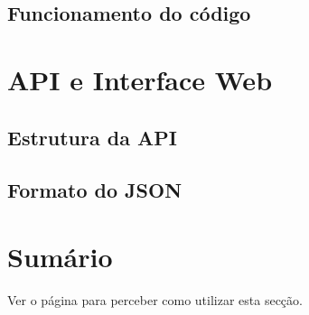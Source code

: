 \subsection{Funcionamento do código}

\section{API e Interface Web}

\subsection{Estrutura da API}

\subsection{Formato do JSON}


\section*{Sumário}

Ver o  página \pageref{sec:intro_summary} para perceber como utilizar esta secção.


